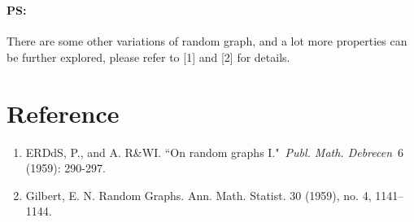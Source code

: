 \documentclass{IEEEconf}
\newcommand{\tmtextit}[1]{{\itshape{#1}}}
\newenvironment{enumeratenumeric}{\begin{enumerate}[1.] }{\end{enumerate}}
\begin{document}
\

\paragraph{PS:}There are some other variations of random graph, and a lot
more properties can be further explored, please refer to [1] and [2] for
details.

\section{Reference}

\begin{enumeratenumeric}
  \item ERDdS, P., and A. R\&WI. ``On random graphs I."~\tmtextit{Publ. Math.
  Debrecen}~6 (1959): 290-297.
  
  \item \label{dynamic_citation}Gilbert, E. N. Random Graphs. Ann. Math.
  Statist. 30 (1959), no. 4, 1141--1144.
\end{enumeratenumeric}
\end{document}
